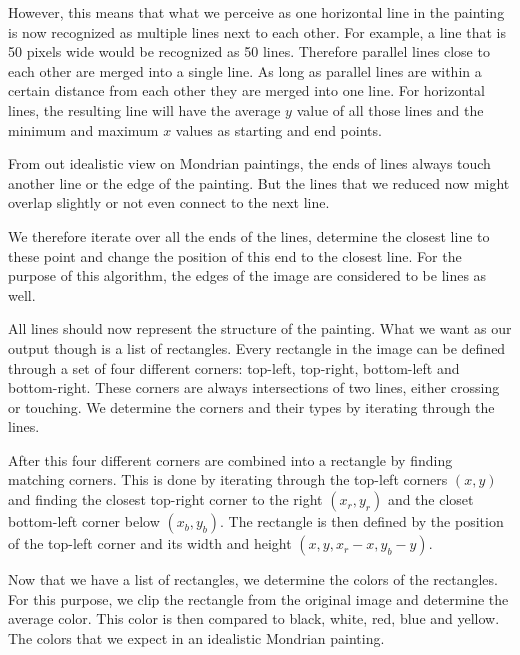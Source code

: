 However, this means that what we perceive as one horizontal line in the painting
is now recognized as multiple lines next to each other. For example, a line that
is 50 pixels wide would be recognized as 50 lines. Therefore parallel lines
close to each other are merged into a single line. As long as parallel lines are
within a certain distance from each other they are merged into one line. For
horizontal lines, the resulting line will have the average $y$ value of all those
lines and the minimum and maximum $x$ values as starting and end points.

From out idealistic view on Mondrian paintings, the ends of lines always touch
another line or the edge of the painting. But the lines that we reduced now might
overlap slightly or not even connect to the next line.

We therefore iterate over all the ends of the lines, determine the closest line
to these point and change the position of this end to the closest line. For the
purpose of this algorithm, the edges of the image are considered to be lines as
well.

All lines should now represent the structure of the painting. What we want as
our output though is a list of rectangles. Every rectangle in the image can be
defined through a set of four different corners: top-left, top-right,
bottom-left and bottom-right. These corners are always intersections of two
lines, either crossing or touching. We determine the corners and their types by
iterating through the lines.


After this four different corners are combined into a rectangle by finding
matching corners. This is done by iterating through the top-left corners $(x,y)$ and
finding the closest top-right corner to the right $(x_r, y_r)$ and the closet bottom-left
corner below $(x_b, y_b)$. The rectangle is then defined by the position of the
top-left corner and its width and height $(x,y,x_r-x,y_b-y)$.

Now that we have a list of rectangles, we determine the colors of the
rectangles. For this purpose, we clip the rectangle from the original image and
determine the average color. This color is then compared to black, white, red,
blue and yellow. The colors that we expect in an idealistic Mondrian painting.
